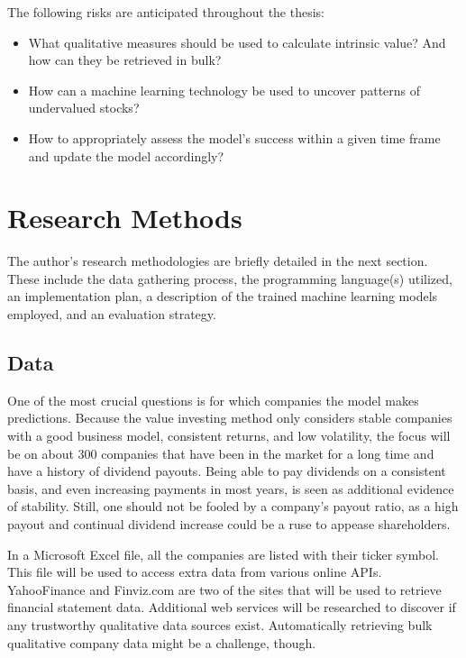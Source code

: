 \documentclass{imc-inf}
\begin{document}
The following risks are anticipated throughout the thesis:

\begin{itemize}
	\item What qualitative measures should be used to calculate intrinsic value? And how can they be retrieved in bulk?
	\item How can a machine learning technology be used to uncover patterns of undervalued stocks?
	\item How to appropriately assess the model's success within a given time frame and update the model accordingly?
\end{itemize}

\section{Research Methods}

The author's research methodologies are briefly detailed in the next section. These include the data gathering process, the programming language(s) utilized, an implementation plan, a description of the trained machine learning models employed, and an evaluation strategy.

\subsection{Data}%
One of the most crucial questions is for which companies the model makes predictions. Because the value investing method only considers stable companies with a good business model, consistent returns, and low volatility, the focus will be on about 300 companies that have been in the market for a long time and have a history of dividend payouts. Being able to pay dividends on a consistent basis, and even increasing payments in most years, is seen as additional evidence of stability. Still, one should not be fooled by a company's payout ratio, as a high payout and continual dividend increase could be a ruse to appease shareholders.

In a Microsoft Excel file, all the companies are listed with their ticker symbol. This file will be used to access extra data from various online APIs. YahooFinance and Finviz.com are two of the sites that will be used to retrieve financial statement data. Additional web services will be researched to discover if any trustworthy qualitative data sources exist. Automatically retrieving bulk qualitative company data might be a challenge, though. 
\end{document}
